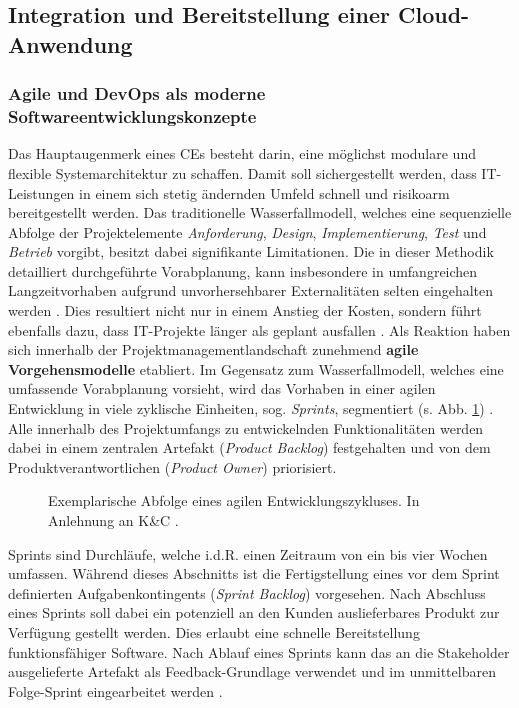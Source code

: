\subsection{Integration und Bereitstellung einer Cloud-Anwendung}
\subsubsection{Agile und DevOps als moderne Softwareentwicklungskonzepte}
Das Hauptaugenmerk eines CEs besteht darin, eine möglichst modulare und flexible Systemarchitektur zu schaffen. Damit soll sichergestellt werden, dass IT-Leistungen in einem sich stetig ändernden Umfeld schnell und risikoarm bereitgestellt werden. Das traditionelle Wasserfallmodell, welches eine sequenzielle Abfolge der Projektelemente \textit{Anforderung}, \textit{Design}, \textit{Implementierung}, \textit{Test} und \textit{Betrieb} vorgibt, besitzt dabei signifikante Limitationen. Die in dieser Methodik detailliert durchgeführte Vorabplanung, kann insbesondere in umfangreichen Langzeitvorhaben aufgrund unvorhersehbarer Externalitäten selten eingehalten werden \cite[5]{Vivenzio.2013}. Dies resultiert nicht nur in einem Anstieg der Kosten, sondern führt ebenfalls dazu, dass IT-Projekte länger als geplant ausfallen \cite[41]{Vieweg.2015}. Als Reaktion haben sich innerhalb der Projektmanagementlandschaft zunehmend \textbf{agile Vorgehensmodelle} etabliert.
Im Gegensatz zum Wasserfallmodell, welches eine umfassende Vorabplanung vorsieht, wird das Vorhaben in einer agilen Entwicklung in viele zyklische Einheiten, sog. \textit{Sprints}, segmentiert (s. Abb. \ref{fig:Agile_Cycle}) \cite[87]{Goll.2015}. Alle innerhalb des Projektumfangs zu entwickelnden Funktionalitäten werden dabei in einem zentralen Artefakt (\textit{Product Backlog}) festgehalten und von dem Produktverantwortlichen (\textit{Product Owner}) priorisiert. 
\begin{center}
	\begin{figure}[H]
		\centering
		\caption[Exemplarische Abfolge eines agilen Entwicklungszykluses]{Exemplarische Abfolge eines agilen Entwicklungszykluses. In Anlehnung an K\&C \cite{K&C.2021}.}
		\label{fig:Agile_Cycle}
	\end{figure}	
\end{center}
\vspace*{-15mm}
Sprints sind Durchläufe, welche i.d.R. einen Zeitraum von ein bis vier Wochen umfassen. Während dieses Abschnitts ist die Fertigstellung eines vor dem Sprint definierten Aufgabenkontingents (\textit{Sprint Backlog}) vorgesehen. Nach Abschluss eines Sprints soll dabei ein potenziell an den Kunden auslieferbares Produkt zur Verfügung gestellt werden. Dies erlaubt eine schnelle Bereitstellung funktionsfähiger Software. Nach Ablauf eines Sprints kann das an die Stakeholder ausgelieferte Artefakt als Feedback-Grundlage verwendet und im unmittelbaren Folge-Sprint eingearbeitet werden \cite[39]{K&C.2021}.
